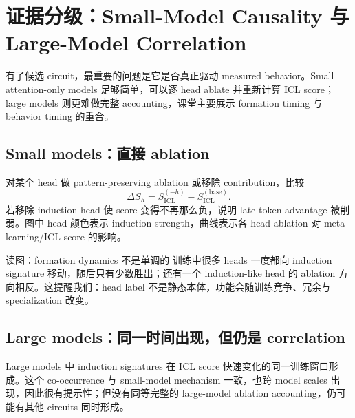 \section{证据分级：Small-Model Causality 与 Large-Model Correlation}

有了候选 circuit，最重要的问题是它是否真正驱动 measured behavior。Small attention-only models 足够简单，可以逐 head ablate 并重新计算 ICL score；large models 则更难做完整 accounting，课堂主要展示 formation timing 与 behavior timing 的重合。

\subsection{Small models：直接 ablation}

对某个 head 做 pattern-preserving ablation 或移除 contribution，比较
\[
\Delta S_h
=S_{\mathrm{ICL}}^{(-h)}-S_{\mathrm{ICL}}^{(\mathrm{base})}.
\]
若移除 induction head 使 score 变得不再那么负，说明 late-token advantage 被削弱。图中 head 颜色表示 induction strength，曲线表示各 head ablation 对 meta-learning/ICL score 的影响。


\begin{knowledgebox}{读图：formation dynamics 不是单调的}
训练中很多 heads 一度都向 induction signature 移动，随后只有少数胜出；还有一个 induction-like head 的 ablation 方向相反。这提醒我们：head label 不是静态本体，功能会随训练竞争、冗余与 specialization 改变。
\end{knowledgebox}


\subsection{Large models：同一时间出现，但仍是 correlation}

Large models 中 induction signatures 在 ICL score 快速变化的同一训练窗口形成。这个 co-occurrence 与 small-model mechanism 一致，也跨 model scales 出现，因此很有提示性；但没有同等完整的 large-model ablation accounting，仍可能有其他 circuits 同时形成。


